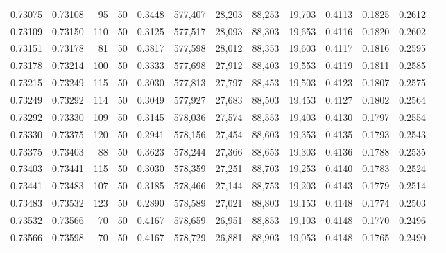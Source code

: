 \begin{tabular}{rrrrrrrrrrrrr}
0.73075 & 0.73108 &    95 &  50 &                                     0.3448 & 577,407 &  28,203 &  88,253 &  19,703 & 0.4113 & 0.1825 & 0.2612 \\
0.73109 & 0.73150 &   110 &  50 &                                     0.3125 & 577,517 &  28,093 &  88,303 &  19,653 & 0.4116 & 0.1820 & 0.2602 \\
0.73151 & 0.73178 &    81 &  50 &                                     0.3817 & 577,598 &  28,012 &  88,353 &  19,603 & 0.4117 & 0.1816 & 0.2595 \\
0.73178 & 0.73214 &   100 &  50 &                                     0.3333 & 577,698 &  27,912 &  88,403 &  19,553 & 0.4119 & 0.1811 & 0.2585 \\
0.73215 & 0.73249 &   115 &  50 &                                     0.3030 & 577,813 &  27,797 &  88,453 &  19,503 & 0.4123 & 0.1807 & 0.2575 \\
0.73249 & 0.73292 &   114 &  50 &                                     0.3049 & 577,927 &  27,683 &  88,503 &  19,453 & 0.4127 & 0.1802 & 0.2564 \\
0.73292 & 0.73330 &   109 &  50 &                                     0.3145 & 578,036 &  27,574 &  88,553 &  19,403 & 0.4130 & 0.1797 & 0.2554 \\
0.73330 & 0.73375 &   120 &  50 &                                     0.2941 & 578,156 &  27,454 &  88,603 &  19,353 & 0.4135 & 0.1793 & 0.2543 \\
0.73375 & 0.73403 &    88 &  50 &                                     0.3623 & 578,244 &  27,366 &  88,653 &  19,303 & 0.4136 & 0.1788 & 0.2535 \\
0.73403 & 0.73441 &   115 &  50 &                                     0.3030 & 578,359 &  27,251 &  88,703 &  19,253 & 0.4140 & 0.1783 & 0.2524 \\
0.73441 & 0.73483 &   107 &  50 &                                     0.3185 & 578,466 &  27,144 &  88,753 &  19,203 & 0.4143 & 0.1779 & 0.2514 \\
0.73483 & 0.73532 &   123 &  50 &                                     0.2890 & 578,589 &  27,021 &  88,803 &  19,153 & 0.4148 & 0.1774 & 0.2503 \\
0.73532 & 0.73566 &    70 &  50 &                                     0.4167 & 578,659 &  26,951 &  88,853 &  19,103 & 0.4148 & 0.1770 & 0.2496 \\
0.73566 & 0.73598 &    70 &  50 &                                     0.4167 & 578,729 &  26,881 &  88,903 &  19,053 & 0.4148 & 0.1765 & 0.2490 \\

\end{tabular}
